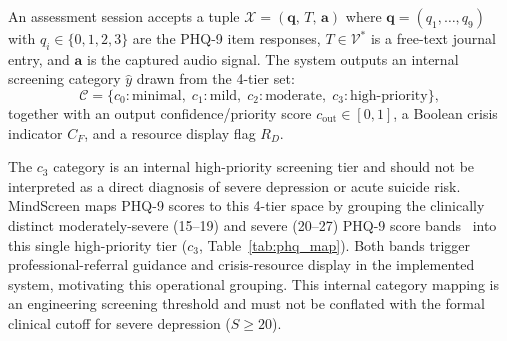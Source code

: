\documentclass[10pt, conference, letterpaper]{IEEEtran}
\begin{document}
An assessment session accepts a tuple
$\mathcal{X} = (\mathbf{q},\, T,\, \mathbf{a})$ where
$\mathbf{q} = (q_1, \dots, q_9)$ with $q_i \in \{0,1,2,3\}$ are the PHQ-9 item
responses, $T \in \mathcal{V}^*$ is a free-text journal entry, and
$\mathbf{a}$ is the captured audio signal.
The system outputs an internal screening category $\hat{y}$ drawn from the
4-tier set:
\begin{equation}
  \mathcal{C} = \{c_0\!:\!\text{minimal},\;c_1\!:\!\text{mild},\;
                  c_2\!:\!\text{moderate},\;c_3\!:\!\text{high-priority}\},
  \label{eq:label_space}
\end{equation}
together with an output confidence/priority score $c_{\text{out}} \in [0,1]$, a
Boolean crisis indicator $C_F$, and a resource display flag $R_D$.

The $c_3$ category is an internal high-priority screening tier and should not be
interpreted as a direct diagnosis of severe depression or acute suicide risk.
MindScreen maps PHQ-9 scores to this 4-tier space by grouping the clinically
distinct moderately-severe (15--19) and severe (20--27) PHQ-9 score bands~\cite{kroenke2001}
into this single high-priority tier ($c_3$, Table~\ref{tab:phq_map}).
Both bands trigger professional-referral guidance and crisis-resource display
in the implemented system, motivating this operational grouping.
This internal category mapping is an engineering screening threshold and
must not be conflated with the formal clinical cutoff for severe depression
($S \ge 20$).

\begin{table}[!t]
\caption{PHQ-9 Score to MindScreen Internal Screening Tier Mapping}
\label{tab:phq_map}
\centering
{}
\end{table}
\end{document}
